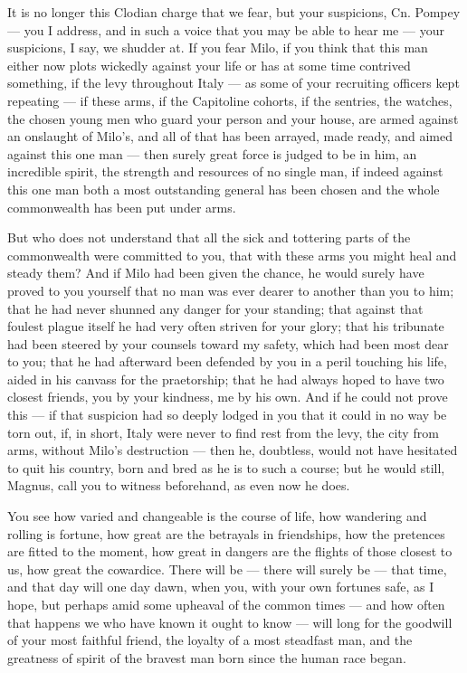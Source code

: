  It is no longer this Clodian charge that we fear, but your suspicions, Cn. Pompey --- you I address, and in such a voice that you may be able to hear me --- your suspicions, I say, we shudder at. If you fear Milo, if you think that this man either now plots wickedly against your life or has at some time contrived something, if the levy throughout Italy --- as some of your recruiting officers kept repeating --- if these arms, if the Capitoline cohorts, if the sentries, the watches, the chosen young men who guard your person and your house, are armed against an onslaught of Milo's, and all of that has been arrayed, made ready, and aimed against this one man --- then surely great force is judged to be in him, an incredible spirit, the strength and resources of no single man, if indeed against this one man both a most outstanding general has been chosen and the whole commonwealth has been put under arms.

 But who does not understand that all the sick and tottering parts of the commonwealth were committed to you, that with these arms you might heal and steady them? And if Milo had been given the chance, he would surely have proved to you yourself that no man was ever dearer to another than you to him; that he had never shunned any danger for your standing; that against that foulest plague itself he had very often striven for your glory; that his tribunate had been steered by your counsels toward my safety, which had been most dear to you; that he had afterward been defended by you in a peril touching his life, aided in his canvass for the praetorship; that he had always hoped to have two closest friends, you by your kindness, me by his own. And if he could not prove this --- if that suspicion had so deeply lodged in you that it could in no way be torn out, if, in short, Italy were never to find rest from the levy, the city from arms, without Milo's destruction --- then he, doubtless, would not have hesitated to quit his country, born and bred as he is to such a course; but he would still, Magnus, call you to witness beforehand, as even now he does.

 You see how varied and changeable is the course of life, how wandering and rolling is fortune, how great are the betrayals in friendships, how the pretences are fitted to the moment, how great in dangers are the flights of those closest to us, how great the cowardice. There will be --- there will surely be --- that time, and that day will one day dawn, when you, with your own fortunes safe, as I hope, but perhaps amid some upheaval of the common times --- and how often that happens we who have known it ought to know --- will long for the goodwill of your most faithful friend, the loyalty of a most steadfast man, and the greatness of spirit of the bravest man born since the human race began.

